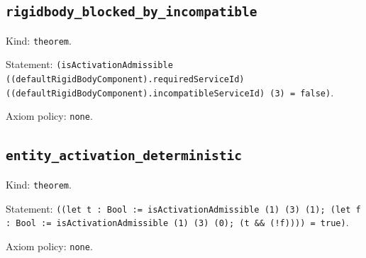\documentclass[11pt]{article}
\begin{document}
\subsection*{\texttt{rigidbody\_blocked\_by\_incompatible}}
\noindent Kind: \texttt{theorem}.\par
\noindent Statement: \texttt{(isActivationAdmissible ((defaultRigidBodyComponent).requiredServiceId) ((defaultRigidBodyComponent).incompatibleServiceId) (3) = false)}.\par
\noindent Axiom policy: \texttt{none}.\par
\subsection*{\texttt{entity\_activation\_deterministic}}
\noindent Kind: \texttt{theorem}.\par
\noindent Statement: \texttt{((let t : Bool := isActivationAdmissible (1) (3) (1); (let f : Bool := isActivationAdmissible (1) (3) (0); (t \&\& (!f)))) = true)}.\par
\noindent Axiom policy: \texttt{none}.\par
\end{document}
